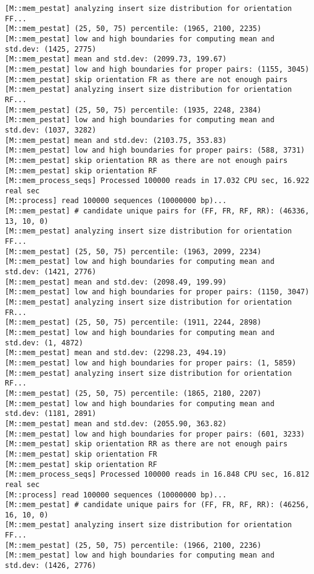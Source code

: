 \begin{lstlisting}
[M::mem_pestat] analyzing insert size distribution for orientation FF...
[M::mem_pestat] (25, 50, 75) percentile: (1965, 2100, 2235)
[M::mem_pestat] low and high boundaries for computing mean and std.dev: (1425, 2775)
[M::mem_pestat] mean and std.dev: (2099.73, 199.67)
[M::mem_pestat] low and high boundaries for proper pairs: (1155, 3045)
[M::mem_pestat] skip orientation FR as there are not enough pairs
[M::mem_pestat] analyzing insert size distribution for orientation RF...
[M::mem_pestat] (25, 50, 75) percentile: (1935, 2248, 2384)
[M::mem_pestat] low and high boundaries for computing mean and std.dev: (1037, 3282)
[M::mem_pestat] mean and std.dev: (2103.75, 353.83)
[M::mem_pestat] low and high boundaries for proper pairs: (588, 3731)
[M::mem_pestat] skip orientation RR as there are not enough pairs
[M::mem_pestat] skip orientation RF
[M::mem_process_seqs] Processed 100000 reads in 17.032 CPU sec, 16.922 real sec
[M::process] read 100000 sequences (10000000 bp)...
[M::mem_pestat] # candidate unique pairs for (FF, FR, RF, RR): (46336, 13, 10, 0)
[M::mem_pestat] analyzing insert size distribution for orientation FF...
[M::mem_pestat] (25, 50, 75) percentile: (1963, 2099, 2234)
[M::mem_pestat] low and high boundaries for computing mean and std.dev: (1421, 2776)
[M::mem_pestat] mean and std.dev: (2098.49, 199.99)
[M::mem_pestat] low and high boundaries for proper pairs: (1150, 3047)
[M::mem_pestat] analyzing insert size distribution for orientation FR...
[M::mem_pestat] (25, 50, 75) percentile: (1911, 2244, 2898)
[M::mem_pestat] low and high boundaries for computing mean and std.dev: (1, 4872)
[M::mem_pestat] mean and std.dev: (2298.23, 494.19)
[M::mem_pestat] low and high boundaries for proper pairs: (1, 5859)
[M::mem_pestat] analyzing insert size distribution for orientation RF...
[M::mem_pestat] (25, 50, 75) percentile: (1865, 2180, 2207)
[M::mem_pestat] low and high boundaries for computing mean and std.dev: (1181, 2891)
[M::mem_pestat] mean and std.dev: (2055.90, 363.82)
[M::mem_pestat] low and high boundaries for proper pairs: (601, 3233)
[M::mem_pestat] skip orientation RR as there are not enough pairs
[M::mem_pestat] skip orientation FR
[M::mem_pestat] skip orientation RF
[M::mem_process_seqs] Processed 100000 reads in 16.848 CPU sec, 16.812 real sec
[M::process] read 100000 sequences (10000000 bp)...
[M::mem_pestat] # candidate unique pairs for (FF, FR, RF, RR): (46256, 16, 10, 0)
[M::mem_pestat] analyzing insert size distribution for orientation FF...
[M::mem_pestat] (25, 50, 75) percentile: (1966, 2100, 2236)
[M::mem_pestat] low and high boundaries for computing mean and std.dev: (1426, 2776)

\end{lstlisting}

